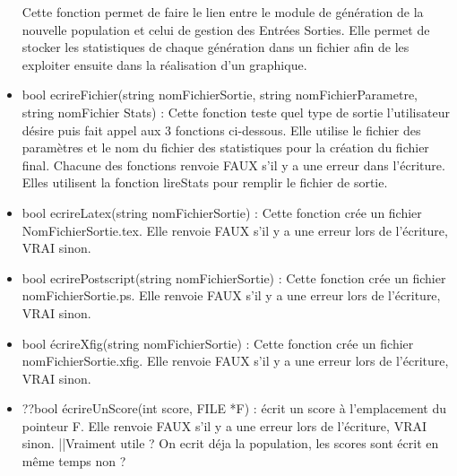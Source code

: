 \documentclass[a4paper,11pt]{article}
\begin{document}
\begin{itemize}
					Cette fonction permet de faire le lien entre le module de génération de la nouvelle population et celui de gestion des Entrées Sorties. 
					Elle permet de stocker les statistiques de chaque génération dans un fichier afin de les exploiter ensuite dans la réalisation d’un graphique.\vspace{0.2cm}
				\item bool ecrireFichier(string nomFichierSortie, string nomFichierParametre, string nomFichier Stats) : Cette fonction teste quel type de sortie l’utilisateur désire puis fait appel aux 3 fonctions ci-dessous. 
					Elle utilise le fichier des paramètres et le nom du fichier des statistiques pour la création du fichier final. 
					Chacune des fonctions renvoie FAUX s’il y a une erreur dans l’écriture. Elles utilisent la fonction lireStats pour remplir le fichier de sortie.\vspace{0.2cm}
				\item bool ecrireLatex(string nomFichierSortie) : Cette fonction crée un fichier NomFichierSortie.tex.
					Elle renvoie FAUX s’il y a une erreur lors de l’écriture, VRAI sinon.\vspace{0.2cm}
				\item bool ecrirePostscript(string nomFichierSortie)  : Cette fonction crée un fichier nomFichierSortie.ps.
					Elle renvoie FAUX s’il y a une erreur lors de l’écriture, VRAI sinon.\vspace{0.2cm}
				\item bool écrireXfig(string nomFichierSortie)  : Cette fonction crée un fichier nomFichierSortie.xfig.
					Elle renvoie FAUX s’il y a une erreur lors de l’écriture, VRAI sinon.\vspace{0.2cm}
				\item ??bool écrireUnScore(int score, FILE *F) : écrit un score à l’emplacement du pointeur F.
					Elle renvoie FAUX s’il y a une erreur lors de l’écriture, VRAI sinon. ||Vraiment utile ? On ecrit déja la population, les scores sont écrit en même temps non ?\\
			\end{itemize}
		
\end{document}
